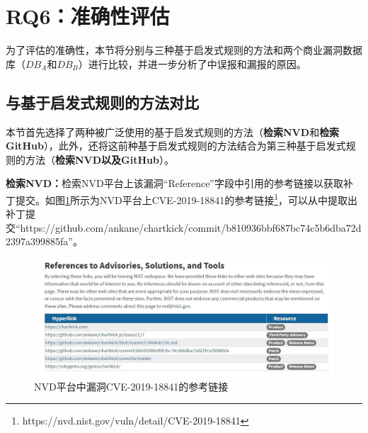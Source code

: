 \section{RQ6：准确性评估}\label{sec:accuracy-evaluation}

为了评估\tool 的准确性，本节将\tool 分别与三种基于启发式规则的方法和两个商业漏洞数据库（$DB_A$和$DB_B$）进行比较，并进一步分析了\tool 中误报和漏报的原因。

\subsection{与基于启发式规则的方法对比}
本节首先选择了两种被广泛使用的基于启发式规则的方法（\textbf{检索NVD}\cite{duan2019automating,li2016vulpecker,li2018vuldeepecker}和\textbf{检索GitHub}\cite{you2017semfuzz,Wang2020empirical}），此外，还将这前种基于启发式规则的方法结合为第三种基于启发式规则的方法（\textbf{检索NVD以及GitHub}）。

\textbf{检索NVD：}检索NVD平台上该漏洞“Reference”字段中引用的参考链接以获取补丁提交。如图\ref{fig:CVE-2019-18841}所示为NVD平台上CVE-2019-18841的参考链接\footnote{https://nvd.nist.gov/vuln/detail/CVE-2019-18841}，可以从中提取出补丁提交“https://github.com/ankane/chartkick/commit/b810936bbf687bc74c5b6dba72d2397a399885fa”。
\begin{figure}[!t]
    \centering
    \includegraphics[scale=0.44]{fig/NVD-2019-18841}
    \caption{NVD平台中漏洞CVE-2019-18841的参考链接}\label{fig:CVE-2019-18841}
\end{figure}

